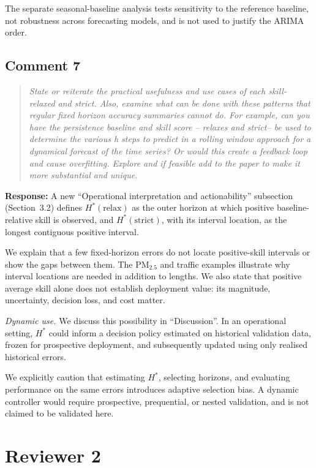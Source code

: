 \documentclass[11pt,a4paper]{article}
\let\originalsubsection\subsection
\renewcommand{\subsection}{\Needspace{9\baselineskip}\originalsubsection}
\let\originalsection\section
\renewcommand{\section}{\Needspace{12\baselineskip}\originalsection}
\newenvironment{reviewcomment}
  {\begin{quote}\itshape}
  {\end{quote}}
\newcommand{\response}{\noindent\textbf{Response:} }
\begin{document}
The separate seasonal-baseline analysis tests sensitivity to the reference
baseline, not robustness across forecasting models, and is not used to justify
the ARIMA order.


\subsection*{Comment 7}

\begin{reviewcomment}
State or reiterate the practical usefulness and use cases of each skill- relaxed and strict. Also, examine what can be done with these patterns that regular fixed horizon accuracy summaries cannot do. For example, can you have the persistence baseline and skill score -- relaxes and strict-- be used to determine the various h steps to predict in a rolling window approach for a dynamical forecast of the time series? Or would this create a feedback loop and cause overfitting. Explore and if feasible add to the paper to make it more substantial and unique.
\end{reviewcomment}

\response
A new ``Operational interpretation and actionability'' subsection
(Section~3.2) defines $H^*(\mathrm{relax})$ as the outer horizon at
which positive baseline-relative skill is observed, and $H^*(\mathrm{strict})$,
with its interval location, as the longest contiguous positive interval.

We explain that a few fixed-horizon errors do not locate positive-skill
intervals or show the gaps between them. The PM$_{2.5}$ and traffic
examples illustrate why interval locations are needed in addition to
lengths. We also state that positive average skill alone does not establish
deployment value: its magnitude, uncertainty, decision loss, and cost matter.

\textit{Dynamic use.} We discuss this possibility in ``Discussion''. In an
operational setting, $H^*$ could inform a decision policy estimated on
historical validation data, frozen for prospective deployment, and subsequently
updated using only realised historical errors.

We explicitly caution that estimating $H^*$, selecting horizons, and
evaluating performance on the same errors introduces adaptive selection bias.
A dynamic controller would require prospective, prequential, or nested
validation, and is not claimed to be validated here.


\section*{Reviewer 2}
\end{document}
